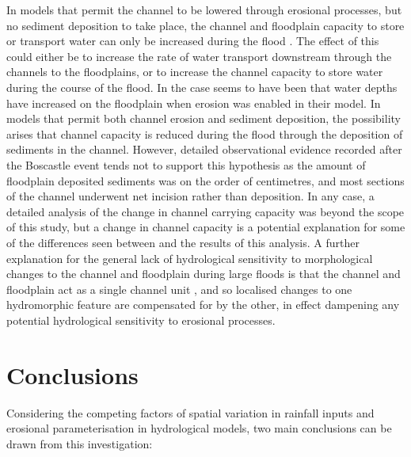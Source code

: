 In models that permit the channel to be lowered through erosional processes, but no sediment deposition to take place, the channel and floodplain capacity to store or transport water can only be increased during the flood \citep[e.g.][]{wong2015sensitivity}. The effect of this could either be to increase the rate of water transport downstream through the channels to the floodplains, or to increase the channel capacity to store water during the course of the flood. In \citet{wong2015sensitivity} the case seems to have been that water depths have increased on the floodplain when erosion was enabled in their model. In models that permit both channel erosion and sediment deposition,  the possibility arises that channel capacity is reduced during the flood through the deposition of sediments in the channel. However, detailed observational evidence recorded after the Boscastle event tends not to support this hypothesis as the amount of floodplain deposited sediments was on the order of centimetres, and most sections of the channel underwent net incision rather than deposition. In any case, a detailed analysis of the change in channel carrying capacity was beyond the scope of this study, but a change in channel capacity is a potential explanation for some of the differences seen between  \citet{wong2015sensitivity} and the results of this analysis. A further explanation for the general lack of hydrological sensitivity to morphological changes to the channel and floodplain during large floods is that the channel and floodplain act as a single channel unit \citep{bates2005numerical}, and so localised changes to one hydromorphic feature are compensated for by the other, in effect dampening any potential hydrological sensitivity to erosional processes.


\section{Conclusions}  %
Considering the competing factors of spatial variation in rainfall inputs and erosional parameterisation in hydrological models, two main conclusions can be drawn from this investigation:

